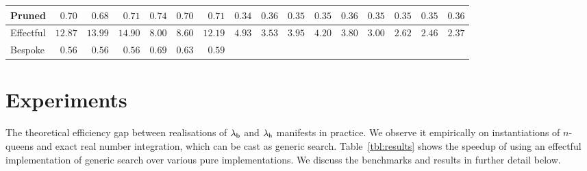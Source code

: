 \documentclass[12pt,phd,lfcs,twoside,openright,logo,leftchapter,normalheadings]{infthesis}
\theoremstyle{plain}
\theoremstyle{definition}
\begin{document}
{\begin{table*}
\begin{tabular}{@{}| l | r@{\,} | r@{\,} | r@{\,} |@{\,}| r@{\,} | r@{\,} | r@{\,} |@{\,}| r@{\,} |@{\,}| r@{\,} | r@{\,} | r@{\,} |@{\,}| r@{\,} | r@{\,} | r@{\,} | r@{\,} | r@{\,} |@{}}
    Pruned &
    $0.70$ &
    $0.68$ &
    $0.71$ &
    $0.74$ &
    $0.70$ &
    $0.71$ &
    $0.34$ &
    $0.36$ &
    $0.35$ &
    $0.35$ &
    $0.36$ &
    $0.35$ &
    $0.35$ &
    $0.35$ &
    $0.36$
    \\\hline

    Effectful &
    $12.87$ &
    $13.99$ &
    $14.90$ &
    $8.00$ &
    $8.60$ &
    $12.19$ &
    $4.93$ &
    $3.53$ &
    $3.95$ &
    $4.20$ &
    $3.80$ &
    $3.00$ &
    $2.62$ &
    $2.46$ &
    $2.37$
    \\\cline{1-16}

    Bespoke &
    $0.56$ &
    $0.56$ &
    $0.56$ &
    $0.69$ &
    $0.63$ &
    $0.59$ &
    \multicolumn{9}{l}{}
    \\\cline{1-7}
  \end{tabular}
\end{table*}}

\tableone
\tabletwo

\section{Experiments}
\label{sec:experiments}
The theoretical efficiency gap between realisations of $\lambda_{\mathsf{b}}$ and
$\lambda_{\mathsf{h}}$ manifests in practice. We observe it empirically on
instantiations of $n$-queens and exact real number integration, which
can be cast as generic search. Table~\ref{tbl:results} shows the
speedup of using an effectful implementation of generic search over
various pure implementations. We discuss the benchmarks and results in
further detail below.

\setlength{\floatsep}{1.0ex}
\setlength{\textfloatsep}{1.0ex}
\end{document}
